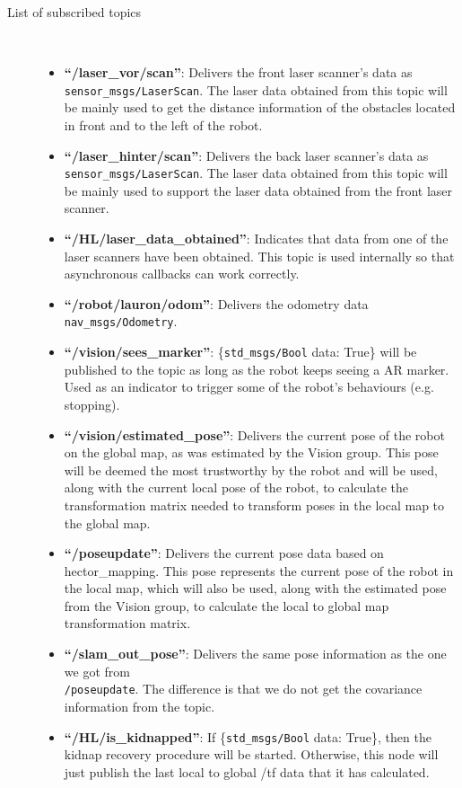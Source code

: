 \begin{description}
\item[List of subscribed topics]\
	\begin{itemize}
	\item \textbf{``/laser\_vor/scan''}: Delivers the front laser scanner's data as \texttt{sensor\_msgs/LaserScan}. The laser data obtained from this topic will be mainly used to get the distance information of the obstacles located in front and to the left of the robot.
	\item \textbf{``/laser\_hinter/scan''}: Delivers the back laser scanner's data as \\ \texttt{sensor\_msgs/LaserScan}. The laser data obtained from this topic will be mainly used to support the laser data obtained from the front laser scanner.
	\item \textbf{``/HL/laser\_data\_obtained''}: Indicates that data from one of the laser scanners have been obtained. This topic is used internally so that asynchronous callbacks can work correctly.
	\item \textbf{``/robot/lauron/odom''}: Delivers the odometry data \texttt{nav\_msgs/Odometry}.
	\item \textbf{``/vision/sees\_marker''}: \{\texttt{std\_msgs/Bool} data: True\} will be published to the topic as long as the robot keeps seeing a AR marker. Used as an indicator to trigger some of the robot's behaviours (e.g. stopping).
	\item \textbf{``/vision/estimated\_pose''}: Delivers the current pose of the robot on the global map, as was estimated by the Vision group. This pose will be deemed the most trustworthy by the robot and will be used, along with the current local pose of the robot, to calculate the transformation matrix needed to transform poses in the local map to the global map.
	\item \textbf{``/poseupdate''}: Delivers the current pose data based on hector\_mapping. This pose represents the current pose of the robot in the local map, which will also be used, along with the estimated pose from the Vision group, to calculate the local to global map transformation matrix.
	\item \textbf{``/slam\_out\_pose''}: Delivers the same pose information as the one we got from \\ \texttt{/poseupdate}. The difference is that we do not get the covariance information from the topic.
	\item \textbf{``/HL/is\_kidnapped''}: If \{\texttt{std\_msgs/Bool} data: True\}, then the kidnap recovery procedure will be started. Otherwise, this node will just publish the last local to global /tf data that it has calculated.
	\end{itemize}
\end{description}

